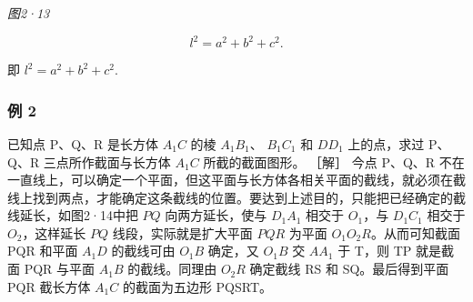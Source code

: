 \emph{图2·13}

\[
l ^ {2} = a ^ {2} + b ^ {2} + c ^ {2}.
\]

即 \(l^2 = a^2 + b^2 + c^2.\)

\subsubsection{例 2}

已知点 P、Q、R 是长方体 \(A_{1}C\) 的棱 \(A_{1}B_{1}\)、 \(B_{1}C_{1}\)
和 \(DD_{1}\) 上的点，求过 P、Q、R 三点所作截面与长方体 \(A_{1}C\)
所截的截面图形。 ［解］ 今点 P、Q、R
不在一直线上，可以确定一个平面，但这平面与长方体各相关平面的截线，就必须在截线上找到两点，才能确定这条截线的位置。要达到上述目的，只能把已经确定的截线延长，如图2·14中把
\(PQ\) 向两方延长，使与 \(D_{1}A_{1}\) 相交于 \(O_{1}\)，与
\(D_{1}C_{1}\) 相交于 \(O_{2}\)，这样延长 \(PQ\) 线段，实际就是扩大平面
\(PQR\) 为平面 \(O_{1}O_{2}R\)。从而可知截面PQR 和平面 \(A_{1}D\)
的截线可由 \(O_{1}B\) 确定，又 \(O_{1}B\) 交 \(AA_{1}\) 于 T，则 TP
就是截面 PQR 与平面 \(A_{1}B\) 的截线。同理由 \(O_{2}R\) 确定截线 RS 和
SQ。最后得到平面 PQR 截长方体 \(A_{1}C\) 的截面为五边形 PQSRT。

